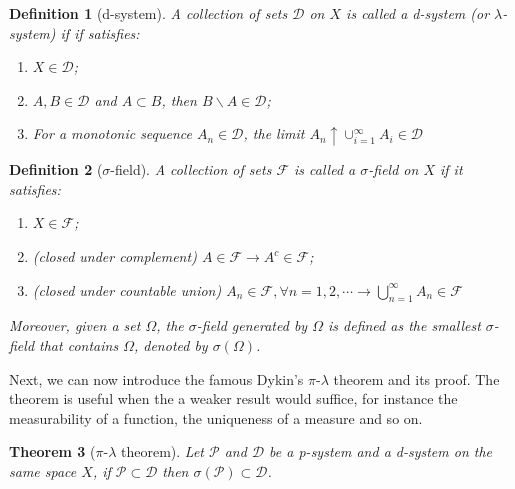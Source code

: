 \documentclass[11pt,english]{smfart}
\newtheorem{theorem}{Theorem}[subsection]
\newtheorem{definition}[theorem]{Definition}
\newcommand{\mc}{\mathcal}
\begin{document}
\begin{definition}[d-system]
    A collection of sets $\mc{D}$ on $X$ is called a d-system (or $\lambda$-system) if if satisfies:\begin{enumerate}
        \item $X \in \mc{D}$;
        \item $A,B \in \mc{D} $ and $A\subset B$, then $B\backslash A \in \mc{D}$;
        \item For a monotonic sequence $A_n \in \mc{D}$, the limit $A_n \uparrow \cup_{i=1}^\infty A_i \in \mc{D}$
    \end{enumerate}
\end{definition}

\begin{definition}[$\sigma$-field]
    A collection of sets $\mc{F}$ is called a $\sigma$-field on $X$ if it satisfies: \begin{enumerate}
        \item $X\in\mc{F}$;
        \item (closed under complement) $A \in \mc{F} \rightarrow A^c \in \mc{F}$;
        \item (closed under countable union) $A_n \in \mc{F}, \forall n=1,2,\cdots \rightarrow \bigcup_{n=1}^\infty A_n \in \mc{F}$
    \end{enumerate}
    Moreover, given a set $\Omega$, the $\sigma$-field generated by $\Omega$ is defined as the smallest $\sigma$-field that contains $\Omega$, denoted by $\sigma(\Omega)$.
\end{definition}

Next, we can now introduce the famous Dykin's $\pi$-$\lambda$ theorem and its proof. The theorem is useful when the a weaker result would suffice, for instance the measurability of a function, the uniqueness of a measure and so on.\\

\begin{theorem}[$\pi$-$\lambda$ theorem]\label{pilambda}
    Let $\mc{P}$ and $\mc{D}$ be a p-system and a d-system on the same space $X$, if $\mc{P} \subset \mc{D}$ then $\sigma(\mc{P}) \subset \mc{D}$.\\
\end{theorem}
\end{document}
